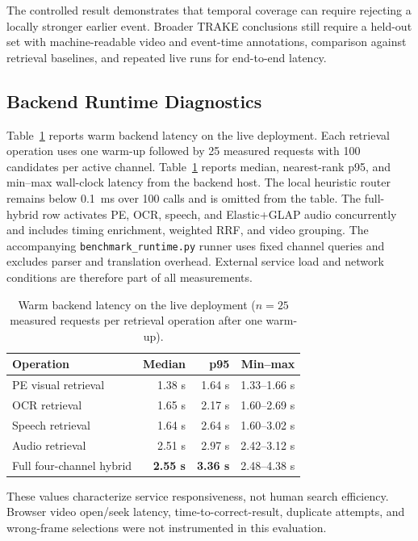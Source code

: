 \documentclass[conference]{IEEEtran}
\begin{document}
The controlled result demonstrates that temporal coverage can require rejecting
a locally stronger earlier event. Broader TRAKE conclusions still require a
held-out set with machine-readable video and event-time annotations, comparison
against retrieval baselines, and repeated live runs for end-to-end latency.

\subsection{Backend Runtime Diagnostics}

Table~\ref{tab:runtime} reports warm backend latency on the live deployment.
Each retrieval operation uses one warm-up followed by 25 measured requests with
100 candidates per active channel. Table~\ref{tab:runtime} reports median,
nearest-rank p95, and min--max wall-clock latency from the backend host. The
local heuristic router remains below 0.1~ms over 100 calls and is omitted from
the table. The full-hybrid row activates PE, OCR, speech, and Elastic+GLAP audio
concurrently and includes timing enrichment, weighted RRF, and video grouping.
The accompanying \texttt{benchmark\_runtime.py} runner uses fixed channel queries
and excludes parser and translation overhead. External service load and network
conditions are therefore part of all measurements.

\begin{table}[!t]
\centering
\caption{Warm backend latency on the live deployment ($n=25$ measured requests
per retrieval operation after one warm-up).}
\label{tab:runtime}
\scriptsize
\setlength{\tabcolsep}{2.5pt}
\begin{tabularx}{\columnwidth}{@{}Xrrr@{}}
\toprule
Operation & Median & p95 & Min--max \\
\midrule
PE visual retrieval & 1.38 s & 1.64 s & 1.33--1.66 s \\
OCR retrieval & 1.65 s & 2.17 s & 1.60--2.69 s \\
Speech retrieval & 1.64 s & 2.64 s & 1.60--3.02 s \\
Audio retrieval & 2.51 s & 2.97 s & 2.42--3.12 s \\
Full four-channel hybrid & \textbf{2.55 s} & \textbf{3.36 s} & 2.48--4.38 s \\
\bottomrule
\end{tabularx}
\end{table}

These values characterize service responsiveness, not human search efficiency.
Browser video open/seek latency, time-to-correct-result, duplicate attempts, and
wrong-frame selections were not instrumented in this evaluation.
\end{document}

